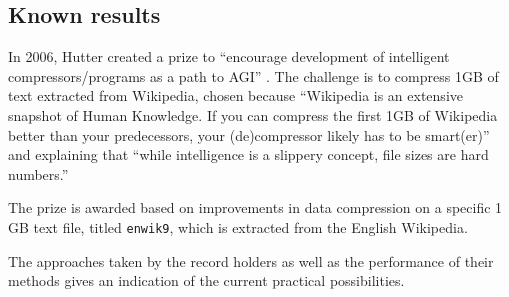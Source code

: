 \subsection{Known results}

In 2006, Hutter created a prize to “encourage development of intelligent compressors/programs as a path to AGI” \autocite{Hutter2006}. The challenge is to compress 1GB of text extracted from Wikipedia, chosen because “Wikipedia is an extensive snapshot of Human Knowledge. If you can compress the first 1GB of Wikipedia better than your predecessors, your (de)compressor likely has to be smart(er)” and explaining that “while intelligence is a slippery concept, file sizes are hard numbers.”

The prize is awarded based on improvements in data compression on a specific 1 GB text file, titled \texttt{enwik9}, which is extracted from the English Wikipedia.

The approaches taken by the record holders as well as the performance of their methods gives an indication of the current practical possibilities.